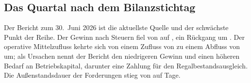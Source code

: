 \subsection{Das Quartal nach dem Bilanzstichtag}

Der Bericht zum 30.~Juni 2026 ist die aktuellste Quelle und der schw\"achste
Punkt der Reihe. Der Gewinn nach Steuern fiel von
\MioINR{\RdyQuartalGewinnVJ} auf \MioINR{\RdyQuartalGewinn}, ein R\"uckgang um
\PctBetrag{\RdyQuartalGewinnWachstum}.
Der operative Mittelzufluss kehrte sich von einem Zufluss von
\MioINR{\RdyQuartalCfVJ} zu einem Abfluss von
\MioINR{\RdyQuartalCfBetrag} um; als Ursachen nennt der Bericht den
niedrigeren Gewinn und einen h\"oheren Bedarf an Betriebskapital, darunter
eine Zahlung f\"ur den Regalbestandsausgleich.
Die Au{\ss}enstandsdauer der Forderungen stieg von \Stueck{\RdyKursTageVJ} auf
\Stueck{\RdyKursTage} Tage.
